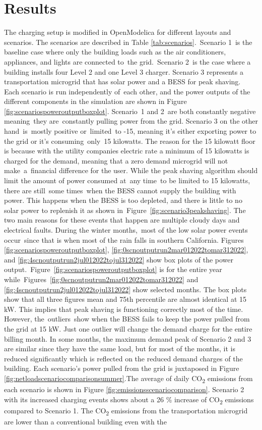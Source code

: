 \documentclass[conference]{IEEEtran}
\begin{document}
\section{Results}
	The charging setup is modified in OpenModelica for different layouts and scenarios. The scenarios are described in Table \ref{tab:scenarios}. Scenario 1 is the baseline case where only the building loads such as the air conditioners, appliances, and lights are connected to the grid. Scenario 2 is the case where a building installs four Level 2 and one Level 3 charger. Scenario 3 represents a transportation microgrid that has solar power and a BESS for peak shaving. Each scenario is run independently of each other, and the power outputs of the different components in the simulation are shown in Figure \ref{fig:scenariospoweroutputboxplot}. Scenario 1 and 2 are both constantly negative meaning they are constantly pulling power from the grid. Scenario 3 on the other hand is mostly positive or limited to -15, meaning it’s either exporting power to the grid or it’s consuming only 15 kilowatts. The reason for the 15 kilowatt floor is because with the utility companies electric rate a minimum of 15 kilowatts is charged for the demand, meaning that a zero demand microgrid will not make a financial difference for the user. While the peak shaving algorithm should limit the amount of power consumed at any time to be limited to 15 kilowatts, there are still some times when the BESS cannot supply the building with power. This happens when the BESS is too depleted, and there is little to no solar power to replenish it as shown in Figure \ref{fig:scenario3peakshaving}. The two main reasons for these events that happen are multiple cloudy days and electrical faults. During the winter months, most of the low solar power events occur since that is when most of the rain falls in southern California. Figures \ref{fig:scenariospoweroutputboxplot}, \ref{fig:0scnoutputrun2mar012022tomar312022}, and \ref{fig:4scnoutputrun2jul012022tojul312022} show box plots of the power output. Figure \ref{fig:scenariospoweroutputboxplot} is for the entire year while Figures \ref{fig:0scnoutputrun2mar012022tomar312022} and \ref{fig:4scnoutputrun2jul012022tojul312022} show selected months. The box plots show that all three figures mean and 75th percentile are almost identical at 15 kW. This implies that peak shaving is functioning correctly most of the time. However, the outliers show when the BESS fails to keep the power pulled from the grid at 15 kW. Just one outlier will change the demand charge for the entire billing month. In some months, the maximum demand peak of Scenario 2 and 3 are similar since they have the same load, but for most of the months, it is reduced significantly which is reflected on the reduced demand charges of the building. Each scenario’s power pulled from the grid is juxtaposed in Figure \ref{fig:netloadscenariocomparisonsummer}.The average of daily CO\textsubscript{2} emissions from each scenario is shown in Figure \ref{fig:emissionsscenariocomparison}. Scenario 2 with its increased charging events shows about a 26 \% increase of CO\textsubscript{2} emissions compared to Scenario 1. The CO\textsubscript{2} emissions from the transportation microgrid are lower than a conventional building even with the 
\end{document}
